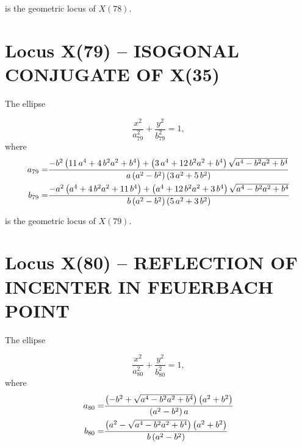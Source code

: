 \documentclass[11pt]{amsart}
\theoremstyle{plain}
\theoremstyle{definition}
\begin{document}
          is the geometric locus of $X(78)$.
          
       
     \section{Locus X(79) -- ISOGONAL CONJUGATE OF X(35) }
     
     
     The ellipse 
     
     \[ \frac{x^2}{a_{79}^2}+\frac{y^2}{b_{79}^2}=1, \]
     where
     \[   \aligned
     a_{ 79}=&  {\frac {-{b}^{2} \left( 11\,{a}^{4}+4\,{b}^{2}{a}^{2}+{b}^{4} \right) 
     		+ \left( 3\,{a}^{4}+12\,{b}^{2}{a}^{2}+{b}^{4} \right) \sqrt {{a}^{4}-
     			{b}^{2}{a}^{2}+{b}^{4}}}{a \left( a^2-b^2 \right)  
     		\left( 3\,{a}^{2}+5\,{b}^{2} \right) }}
     \\
     b_{79}=&  {\frac {-{a}^{2} \left( {a}^{4}+4\,{b}^{2}{a}^{2}+11\,{b}^{4} \right) 
     		+ \left( {a}^{4}+12\,{b}^{2}{a}^{2}+3\,{b}^{4} \right) \sqrt {{a}^{4}-
     			{b}^{2}{a}^{2}+{b}^{4}}}{b \left( a^2-b^2  \right)  
     		\left( 5\,{a}^{2}+3\,{b}^{2} \right) }}
     \endaligned
     \]
     
     is the geometric locus of $X(79)$.
%       
%     
%     
%     
%     
     

      
          \section{Locus X(80) -- REFLECTION OF INCENTER IN FEUERBACH POINT}
      
      
      The ellipse 
      
      \[ \frac{x^2}{a_{80}^2}+\frac{y^2}{b_{80}^2}=1, \]
      where
      \[   \aligned
      a_{ 80}=&   {\frac { \left( -{b}^{2}+\sqrt {{a}^{4}-{b}^{2}{a}^{2}+{b}^{4}}
      		\right)  \left( {a}^{2}+{b}^{2} \right) }{\left({a}^{2}-{b}^{2}\right) a}}
      \\
      b_{80}=&  {\frac { \left( {a}^{2}-\sqrt {{a}^{4}-{b}^{2}{a}^{2}+{b}^{4}}
      		\right)  \left( {a}^{2}+{b}^{2} \right) }{b\left({a}^{2}-{b}^{2}\right)}}
      \endaligned
      \]
      
\end{document}
